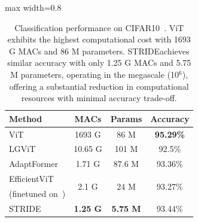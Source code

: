 \documentclass{article}
\newcommand{\name}{STRIDE}
\begin{document}
\begin{table}%
\centering
\caption{\small Classification performance on CIFAR10~\cite{cifar10}. ViT exhibits the highest computational cost with 1693 G MACs and 86 M parameters. \name achieves similar accuracy with only 1.25 G MACs and 5.75 M parameters, operating in the megascale (10\(^6\)), offering a substantial reduction in computational resources with minimal accuracy trade-off.}
\begin{adjustbox}{max width=0.8\textwidth}{
\begin{tabular}{lccc}
\toprule
\textbf{Method} & \textbf{MACs} & \textbf{Params} & \textbf{Accuracy}\\
\midrule
ViT~\cite{dosovitskiy2020image, cifar10Hugging} & 1693 G & 86 M & \textbf{95.29\%}\\
LGViT~\cite{xu2023lgvit} & 10.65 G & 101 M & 92.5\%\\
AdaptFormer~\cite{chen2022adaptformer} & 1.71 G & 87.6 M & 93.36\% \\
EfficientViT~\cite{cai2023efficientvit} & \multirow{2}{*}{2.1 G} & \multirow{2}{*}{24 M} & \multirow{2}{*}{93.27\%}\\
(finetuned on~\cite{efficientvit_b2_huggingface}) &&&\\
\midrule
\name & \textbf{1.25 G} & \textbf{5.75 M} & 93.44\%\\
\bottomrule
\end{tabular}
}
\end{adjustbox}

\label{tab:cifar10}
\end{table}



\end{document}

